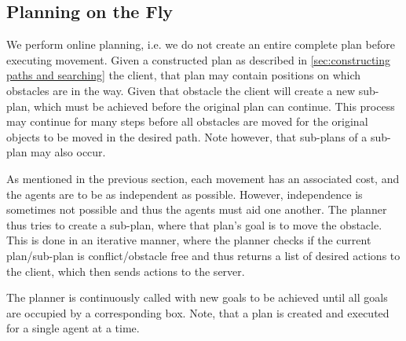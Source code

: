 \subsection{Planning on the Fly}
\label{sec:planning on the fly}

We perform online planning, i.e. we do not create an entire complete plan before executing movement.
Given a constructed plan as described in \cref{sec:constructing paths and searching} the client, that plan may contain positions on which obstacles are in the way.
Given that obstacle the client will create a new sub-plan, which must be achieved before the original plan can continue.
This process may continue for many steps before all obstacles are moved for the original objects to be moved in the desired path.
Note however, that sub-plans of a sub-plan may also occur.

As mentioned in the previous section, each movement has an associated cost, and the agents are to be as independent as possible.
However, independence is sometimes not possible and thus the agents must aid one another.
The planner thus tries to create a sub-plan, where that plan's goal is to move the obstacle.
This is done in an iterative manner, where the planner checks if the current plan/sub-plan is conflict/obstacle free and thus returns a list of desired actions to the client, which then sends actions to the server.

The planner is continuously called with new goals to be achieved until all goals are occupied by a corresponding box.
Note, that a plan is created and executed for a single agent at a time.

